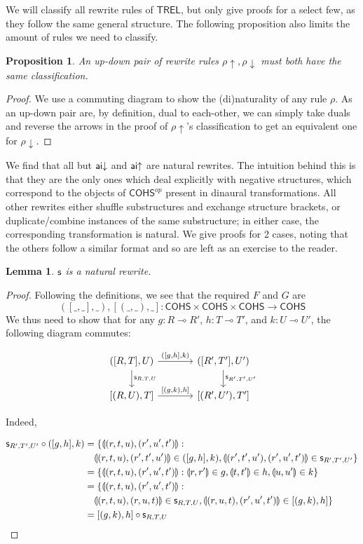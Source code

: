 \documentclass[11pt, oneside]{article}
\theoremstyle{plain}
\newtheorem{proposition}[theorem]{Proposition}
\newtheorem{lemma}[theorem]{Lemma}
\theoremstyle{definition}
\newcommand{\lp}{\llparenthesis}
\newcommand{\rp}{\rrparenthesis}
\newcommand{\sSys}{{\mathsf{TREL}}}%
\newcommand{\cohs}{{\mathsf{COHS}}}
\newcommand{\comp}{\mathbin{\circ}}
\begin{document}
We will classify all rewrite rules of $\sSys$, but only give proofs for a select few, as they follow the same general structure.
The following proposition also limits the amount of rules we need to classify.

\begin{proposition}
An up-down pair of rewrite rules ${\mathsf{\rho}}{\uparrow},{\mathsf{\rho}}{\downarrow}$ must both have the same classification.
\end{proposition}

\begin{proof}
We use a commuting diagram to show the (di)naturality of any rule $\rho$.
As an up-down pair are, by definition, dual to each-other, we can simply take duals and reverse the arrows in the proof of ${\mathsf{\rho}}{\uparrow}$'s classification to get an equivalent one for ${\mathsf{\rho}}{\downarrow}$.
\end{proof}

We find that all but ${\mathsf {ai}}{\downarrow}$ and ${\mathsf {ai}}{ \uparrow}$ are natural rewrites.
The intuition behind this is that they are the only ones which deal explicitly with negative structures, which correspond to the objects of $\cohs^{op}$ present in dinaural transformations.
All other rewrites either shuffle substructures and exchange structure brackets, or duplicate/combine instances of the same substructure; in either case, the corresponding transformation is natural.
We give proofs for 2 cases, noting that the others follow a similar format and so are left as an exercise to the reader.

\begin{lemma}
${\mathsf s}$ is a natural rewrite.
\end{lemma}

\begin{proof}
Following the definitions, we see that the required $F$ and $G$ are
$$([\_,\_],\_),[(\_,\_),\_]:\cohs\times\cohs\times\cohs\to\cohs$$
We thus need to show that for any $g:R\multimap R'$, $h:T\multimap T'$, and $k:U\multimap U'$, the following diagram commutes:

\[
\begin{tikzcd}[column sep = large]
    ([R,T],U) \arrow[r,"{([g,h],k)}"]\arrow[d,"\sw_{R,T,U}"]& ([R',T'],U') \arrow[d,"\sw_{R',T',U'}"] \\
    {[(R,U),T]} \arrow[r,"{[(g,k),h]}"] & {[(R',U'),T']}
\end{tikzcd}
\]

Indeed,

\begin{align*}
\sw_{R',T',U'}\comp ([g,h],k) &= \{\lp(r,t,u),(r',u',t')\rp: \\
&\quad\lp(r,t,u),(r',t',u')\rp\in([g,h],k),\lp(r',t',u'),(r',u',t')\rp\in \sw_{R',T',U'}\} \\
&= \{\lp(r,t,u),(r',u',t')\rp:\lp r,r'\rp\in g, \lp t,t'\rp\in h, \lp u,u'\rp\in k\} \\
&= \{\lp(r,t,u),(r',u',t')\rp: \\
&\quad\lp(r,t,u),(r,u,t)\rp\in \sw_{R,T,U},\lp(r,u,t),(r',u',t')\rp\in[(g,k),h]\} \\
&= [(g,k),h]\comp \sw_{R,T,U}
\end{align*}
\end{proof}
\end{document}
